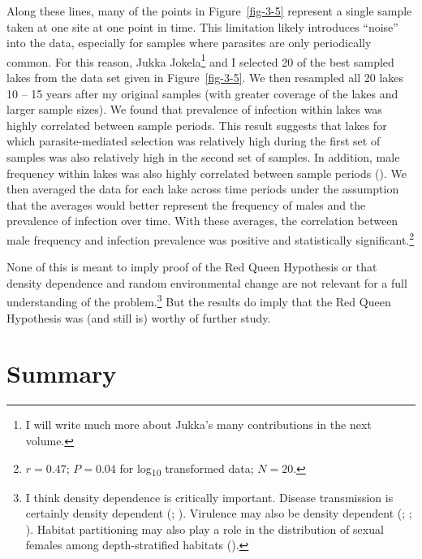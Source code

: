 \documentclass[
  american,
  letterpaper,
]{book}
\begin{document}
Along these lines, many of the points in Figure~\ref{fig-3-5} represent
a single sample taken at one site at one point in time. This limitation
likely introduces ``noise'' into the data, especially for samples where
parasites are only periodically common. For this reason, Jukka
Jokela\footnote{I will write much more about Jukka's many contributions
  in the next volume.} and I selected 20 of the best sampled lakes from
the data set given in Figure~\ref{fig-3-5}. We then resampled all 20
lakes 10 -- 15 years after my original samples (with greater coverage of
the lakes and larger sample sizes). We found that prevalence of
infection within lakes was highly correlated between sample periods.
This result suggests that lakes for which parasite-mediated selection
was relatively high during the first set of samples was also relatively
high in the second set of samples. In addition, male frequency within
lakes was also highly correlated between sample periods
(). We then averaged
the data for each lake across time periods under the assumption that the
averages would better represent the frequency of males and the
prevalence of infection over time. With these averages, the correlation
between male frequency and infection prevalence was positive and
statistically significant.\footnote{\(r = 0.47\); \(P = 0.04\) for
  log\textsubscript{10} transformed data; \(N = 20\).}

None of this is meant to imply proof of the Red Queen Hypothesis or that
density dependence and random environmental change are not relevant for
a full understanding of the problem.\footnote{I think density dependence
  is critically important. Disease transmission is certainly density
  dependent (;
  ). Virulence may also be
  density dependent (;
  ;
  ). Habitat partitioning may
  also play a role in the distribution of sexual females among
  depth-stratified habitats ().} But the results do imply that the Red Queen Hypothesis
was (and still is) worthy of further study.

\section{Summary}\label{summary-2}
\end{document}
